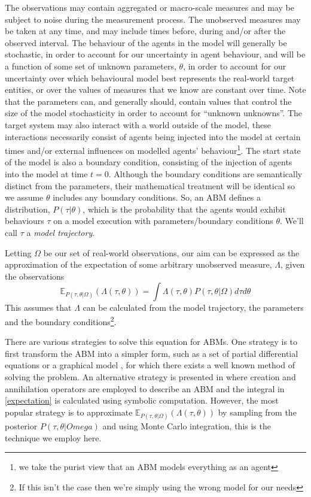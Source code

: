 \documentclass{article}
\begin{document}
The observations may contain aggregated or macro-scale measures and may be subject to noise during the measurement process. The unobserved measures may be taken at any time, and may include times before, during and/or after the observed interval. The behaviour of the agents in the model will generally be stochastic, in order to account for our uncertainty in agent behaviour, and will be a function of some set of unknown parameters, $\theta$, in order to account for our uncertainty over which behavioural model best represents the real-world target entities, or over the values of measures that we know are constant over time. Note that the parameters can, and generally should, contain values that control the size of the model stochasticity in order to account for ``unknown unknowns''. The target system may also interact with a world outside of the model, these interactions necessarily consist of agents being injected into the model at certain times and/or external influences on modelled agents' behaviour\footnote{we take the purist view that an ABM models everything as an agent}. The start state of the model is also a boundary condition, consisting of the injection of agents into the model at time $t=0$. Although the boundary conditions are semantically distinct from the parameters, their mathematical treatment will be identical so we assume $\theta$ includes any boundary conditions. So, an ABM defines a distribution, $P(\tau| \theta)$, which is the probability that the agents would exhibit behaviours $\tau$ on a model execution with parameters/boundary conditions $\theta$. We'll call $\tau$ a \textit{model trajectory}.

Letting $\Omega$ be our set of real-world observations, our aim can be expressed as the approximation of the expectation of some arbitrary unobserved measure, $\Lambda$, given the observations
\begin{equation}
\mathbb{E}_{P(\tau,\theta|\Omega)}(\Lambda(\tau,\theta)) = \int \Lambda(\tau,\theta) P(\tau,\theta|\Omega) d\tau d\theta
\label{expectation}
\end{equation}
This assumes that $\Lambda$ can be calculated from the model trajectory, the parameters and the boundary conditions\footnote{If this isn't the case then we're simply using the wrong model for our needs}. 

There are various strategies to solve this equation for ABMs. One strategy is to first transform the ABM into a simpler form, such as a set of partial differential equations \citep{lloyd_exploring_2016} or a graphical model \citep{liao2010integrated}, for which there exists a well known method of solving the problem. An alternative strategy is presented in \citet{tang2019data} where creation and annihilation operators are employed to describe an ABM and the integral in \eqref{expectation} is calculated using symbolic computation. However, the most popular strategy is to approximate $\mathbb{E}_{P(\tau,\theta|\Omega)}(\Lambda(\tau,\theta))$ by sampling from the posterior $P(\tau,\theta|Omega)$ and using Monte Carlo integration, this is the technique we employ here.
\end{document}

